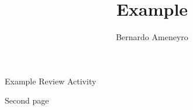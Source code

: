 \documentclass{utkmath123ra}
\author{Bernardo Ameneyro}
\title{Example}
\begin{document}
\MakeTitle

Example Review Activity

\newpage

Second page
\end{document}
